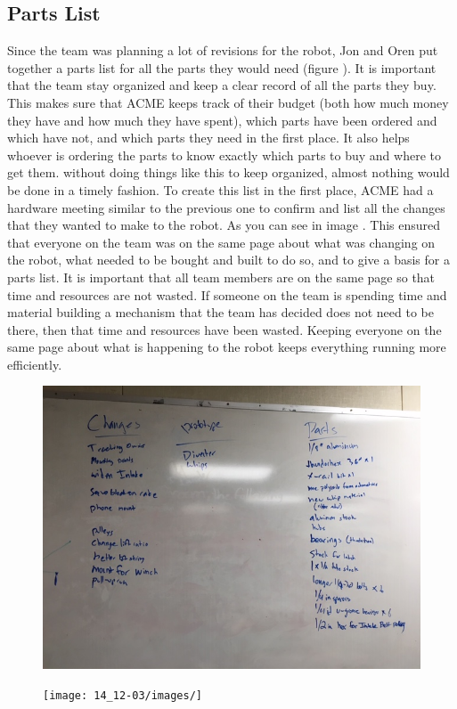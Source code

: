 \documentclass{article}
\begin{document}
\subsection{Parts List}
Since the team was planning a lot of revisions for the robot, Jon and Oren put together a parts list for all the parts they would need (figure ). It is important that the team stay organized and keep a clear record of all the parts they buy. This makes sure that ACME keeps track of their budget (both how much money they have and how much they have spent), which parts have been ordered and which have not, and which parts they need in the first place. It also helps whoever is ordering the parts to know exactly which parts to buy and where to get them. without doing things like this to keep organized, almost nothing would be done in a timely fashion. To create this list in the first place, ACME had a hardware meeting similar to the previous one to confirm and list all the changes that they wanted to make to the robot. As you can see in image . This ensured that everyone on the team was on the same page about what was changing on the robot, what needed to be bought and built to do so, and to give a basis for a parts list. It is important that all team members are on the same page so that time and resources are not wasted. If someone on the team is spending time and material building a mechanism that the team has decided does not need to be there, then that time and resources have been wasted. Keeping everyone on the same page about what is happening to the robot keeps everything running more efficiently.

\begin{figure}
    \centering
    \includegraphics[width=.6 \textwidth]{14_12-03/images/IMG_0422.JPG}
    \caption{}
    \label{fig: Parts list}
\end{figure}

\begin{figure}
    \centering
    \texttt{[image: 14\_12-03/images/]}
    \caption{}
    \label{fig: Robot Changes}
\end{figure}
\end{document}
